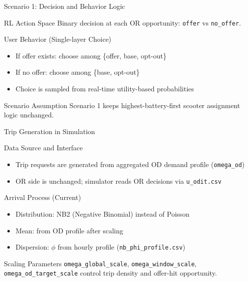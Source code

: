 ﻿\documentclass[aspectratio=169]{beamer}
\newcommand{\tightlist}{\setlength{\itemsep}{4pt}\setlength{\parskip}{0pt}}
\begin{document}
\begin{frame}{Scenario 1: Decision and Behavior Logic}
\begin{block}{RL Action Space}
Binary decision at each OR opportunity: \texttt{offer} vs \texttt{no\_offer}.
\end{block}

\begin{block}{User Behavior (Single-layer Choice)}
\begin{itemize}\tightlist
  \item If offer exists: choose among \{offer, base, opt-out\}
  \item If no offer: choose among \{base, opt-out\}
  \item Choice is sampled from real-time utility-based probabilities
\end{itemize}
\end{block}

\begin{alertblock}{Scenario Assumption}
Scenario 1 keeps highest-battery-first scooter assignment logic unchanged.
\end{alertblock}
\end{frame}

\begin{frame}{Trip Generation in Simulation}
\begin{block}{Data Source and Interface}
\begin{itemize}\tightlist
  \item Trip requests are generated from aggregated OD demand profile (\texttt{omega\_od})
  \item OR side is unchanged; simulator reads OR decisions via \texttt{u\_odit.csv}
\end{itemize}
\end{block}

\begin{block}{Arrival Process (Current)}
\begin{itemize}\tightlist
  \item Distribution: NB2 (Negative Binomial) instead of Poisson
  \item Mean: from OD profile after scaling
  \item Dispersion: $\phi$ from hourly profile (\texttt{nb\_phi\_profile.csv})
\end{itemize}
\end{block}

\begin{alertblock}{Scaling Parameters}
\texttt{omega\_global\_scale}, \texttt{omega\_window\_scale}, \texttt{omega\_od\_target\_scale}
control trip density and offer-hit opportunity.
\end{alertblock}
\end{frame}
\end{document}
